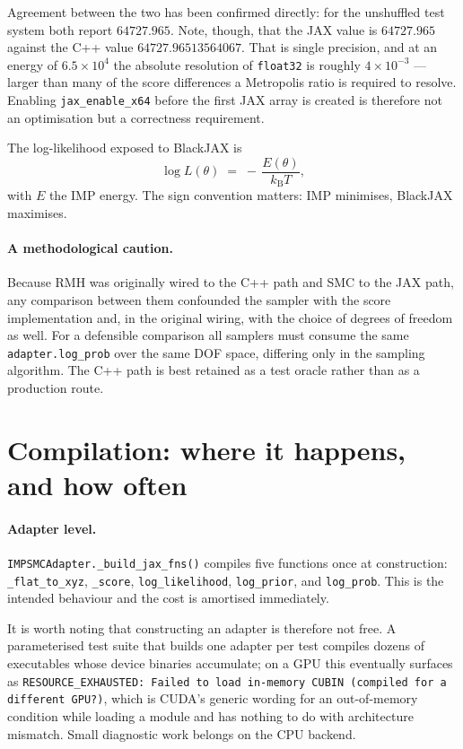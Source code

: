 \documentclass[11pt]{article}
\newcommand{\code}[1]{\texttt{#1}}
\begin{document}
Agreement between the two has been confirmed directly: for the unshuffled test
system both report $64727.965$. Note, though, that the JAX value is
$64727.965$ against the C++ value $64727.96513564067$. That is single precision,
and at an energy of $6.5\times 10^4$ the absolute resolution of
\code{float32} is roughly $4\times10^{-3}$ --- larger than many of the score
differences a Metropolis ratio is required to resolve. Enabling
\code{jax\_enable\_x64} before the first JAX array is created is therefore not
an optimisation but a correctness requirement.

The log-likelihood exposed to BlackJAX is
\begin{equation}
  \log L(\theta) \;=\; -\,\frac{E(\theta)}{k_{\mathrm{B}}T},
\end{equation}
with $E$ the IMP energy. The sign convention matters: IMP minimises, BlackJAX
maximises.

\paragraph{A methodological caution.}
Because RMH was originally wired to the C++ path and SMC to the JAX path, any
comparison between them confounded the sampler with the score implementation
and, in the original wiring, with the choice of degrees of freedom as well. For
a defensible comparison all samplers must consume the same
\code{adapter.log\_prob} over the same DOF space, differing only in the sampling
algorithm. The C++ path is best retained as a test oracle rather than as a
production route.

\section{Compilation: where it happens, and how often}

\paragraph{Adapter level.}
\code{IMPSMCAdapter.\_build\_jax\_fns()} compiles five functions once at
construction: \code{\_flat\_to\_xyz}, \code{\_score}, \code{log\_likelihood},
\code{log\_prior}, and \code{log\_prob}. This is the intended behaviour and the
cost is amortised immediately.

It is worth noting that constructing an adapter is therefore not free. A
parameterised test suite that builds one adapter per test compiles dozens of
executables whose device binaries accumulate; on a GPU this eventually surfaces
as \code{RESOURCE\_EXHAUSTED: Failed to load in-memory CUBIN (compiled for a
different GPU?)}, which is CUDA's generic wording for an out-of-memory
condition while loading a module and has nothing to do with architecture
mismatch. Small diagnostic work belongs on the CPU backend.
\end{document}
